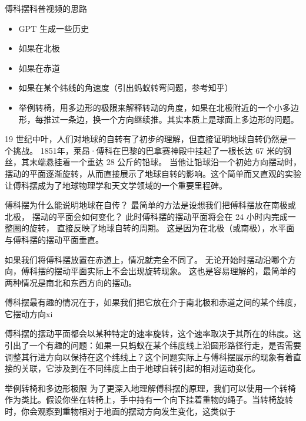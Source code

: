 
\begin{issues}
\issueDraft
\end{issues}

傅科摆科普视频的思路
\begin{itemize}
\item GPT 生成一些历史
\item 如果在北极
\item 如果在赤道
\item 如果在某个纬线的角速度（引出蚂蚁转弯问题，参考知乎）
\item 举例转椅，用多边形的极限来解释转动的角度，如果在北极附近的一个小多边形，每推过一条边，换一个方向继续推。其实本质上是球面上多边形的问题。
\end{itemize}

19 世纪中叶，人们对地球的自转有了初步的理解，但直接证明地球自转仍然是一个挑战。 1851年，莱昂·傅科在巴黎的巴拿赛神殿中挂起了一根长达 67 米的钢丝，其末端悬挂着一个重达 28 公斤的铅球。 当他让铅球沿一个初始方向摆动时，摆动的平面逐渐旋转，从而直接展示了地球自转的影响。这个简单而又直观的实验让傅科摆成为了地球物理学和天文学领域的一个重要里程碑。

傅科摆为什么能说明地球在自传？ 最简单的方法是设想我们把傅科摆放在南极或北极， 摆动的平面会如何变化？ 此时傅科摆的摆动平面将会在 24 小时内完成一整圈的旋转， 直接反映了地球自转的周期。 这是因为在北极（或南极），水平面与傅科摆的摆动平面垂直。

如果我们将傅科摆放置在赤道上，情况就完全不同了。 无论开始时摆动沿哪个方向，傅科摆的摆动平面实际上不会出现旋转现象。 这也是容易理解的，最简单的两种情况是南北和东西方向的摆动。

傅科摆最有趣的情况在于，如果我们把它放在介于南北极和赤道之间的某个纬度，它摆动方向xi

傅科摆的摆动平面都会以某种特定的速率旋转，这个速率取决于其所在的纬度。这引出了一个有趣的问题：如果一只蚂蚁在某个纬度线上沿圆形路径行走，是否需要调整其行进方向以保持在这个纬线上？这个问题实际上与傅科摆展示的现象有着直接的关联，它涉及到在不同纬度上由于地球自转引起的相对运动变化。

举例转椅和多边形极限
为了更深入地理解傅科摆的原理，我们可以使用一个转椅作为类比。假设你坐在转椅上，手中持有一个向下挂着重物的绳子。当转椅旋转时，你会观察到重物相对于地面的摆动方向发生变化，这类似于
